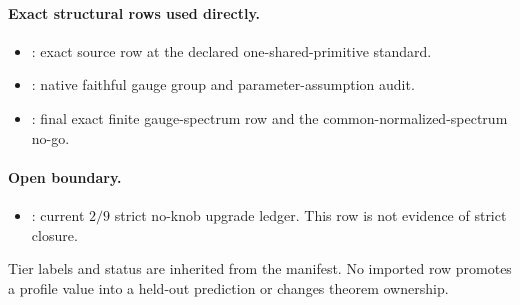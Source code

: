 \documentclass[11pt]{article}
\begin{document}
\paragraph{Exact structural rows used directly.}
\begin{itemize}
\item {}: exact source row at the declared
one-shared-primitive standard.
\item {}: native faithful gauge group and
parameter-assumption audit.
\item {}: final exact finite gauge-spectrum
row and the common-normalized-spectrum no-go.
\end{itemize}

\paragraph{Open boundary.}
\begin{itemize}
\item {}: current \(2/9\) strict no-knob
upgrade ledger. This row is not evidence of strict closure.
\end{itemize}

Tier labels and status are inherited from the manifest. No imported row
promotes a profile value into a held-out prediction or changes theorem
ownership.



\end{document}
